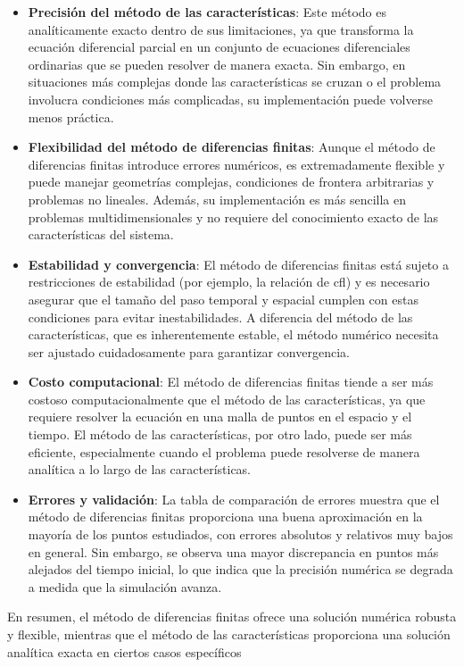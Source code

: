 \begin{itemize}
    \item \textbf{Precisión del método de las características}: Este método es analíticamente exacto dentro de sus limitaciones, ya que transforma la ecuación diferencial parcial en un conjunto de ecuaciones diferenciales ordinarias que se pueden resolver de manera exacta. Sin embargo, en situaciones más complejas donde las características se cruzan o el problema involucra condiciones más complicadas, su implementación puede volverse menos práctica.

    \item \textbf{Flexibilidad del método de diferencias finitas}: Aunque el método de diferencias finitas introduce errores numéricos, es extremadamente flexible y puede manejar geometrías complejas, condiciones de frontera arbitrarias y problemas no lineales. Además, su implementación es más sencilla en problemas multidimensionales y no requiere del conocimiento exacto de las características del sistema.

    \item \textbf{Estabilidad y convergencia}: El método de diferencias finitas está sujeto a restricciones de estabilidad (por ejemplo, la relación de \gls{cfl}) y es necesario asegurar que el tamaño del paso temporal y espacial cumplen con estas condiciones para evitar inestabilidades. A diferencia del método de las características, que es inherentemente estable, el método numérico necesita ser ajustado cuidadosamente para garantizar convergencia.

    \item \textbf{Costo computacional}: El método de diferencias finitas tiende a ser más costoso computacionalmente que el método de las características, ya que requiere resolver la ecuación en una malla de puntos en el espacio y el tiempo. El método de las características, por otro lado, puede ser más eficiente, especialmente cuando el problema puede resolverse de manera analítica a lo largo de las características.

    \item \textbf{Errores y validación}: La tabla de comparación de errores muestra que el método de diferencias finitas proporciona una buena aproximación en la mayoría de los puntos estudiados, con errores absolutos y relativos muy bajos en general. Sin embargo, se observa una mayor discrepancia en puntos más alejados del tiempo inicial, lo que indica que la precisión numérica se degrada a medida que la simulación avanza.
\end{itemize}

En resumen, el método de diferencias finitas ofrece una solución numérica robusta y flexible, mientras que el método de las características proporciona una solución analítica exacta en ciertos casos específicos
